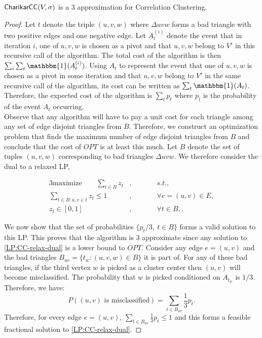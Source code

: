 \begin{theorem}
${\sf CharikarCC}(V,\sigma)$ is a $3$ approximation for Correlation Clustering.
\end{theorem}
\begin{proof} Let $t$ denote the triple $(u,v,w)$ where $\Delta uvw$ forms a bad triangle with two positive edges and one negative edge. Let $A_t^{(i)}$ denote the event that in iteration $i$, one of $u,v,w$ is chosen as a pivot and that $u,v,w$ belong to $V'$ in this recursive call of the algorithm. The total cost of the algorithm is then $\sum_i \sum_t \mathbbm{1} (A_t^{(i)})$. Using $A_t$ to represent the event that one of $u,v,w$ is chosen as a pivot in some iteration and that $u,v,w$ belong to $V'$ in the same recursive call of the algorithm, its cost can be written as $\sum_t \mathbbm{1} (A_t)$. Therefore, the expected cost of the algorithm is $\sum_t p_t$ where $p_t$ is the probability of the event $A_t$ occurring.\\

\noindent Observe that any algorithm will have to pay a unit cost for each triangle among any set of edge disjoint triangles from $B$. Therefore, we construct an optimization problem that finds the maximum number of edge disjoint triangles from $B$ and conclude that the cost of $OPT$ is at least this much. Let $B$ denote the set of tuples $(u,v,w)$ corresponding to bad triangles $\Delta uvw$. We therefore consider the dual to a relaxed LP,

\begin{alignat}{3} \label{LP:CC-relax-dual}
		\text{maximize} \qquad \sum_{t \in B} z_t &, && \qquad s.t., \nonumber\\
		\sum_{t \in B : u,v \in t} z_t \le 1& , &&\qquad \forall e = (u,v) \in E , \nonumber\\
		z_{t} \in [ 0,1 ]&, &&\qquad \forall t \in B,.\tag{LP1}
\end{alignat}

We now show that the set of probabilities $\{ p_t / 3,\ t \in B \}$ forms a valid solution to this LP. This proves that the algorithm is $3$ approximate since any solution to \ref{LP:CC-relax-dual} is a lower bound to $OPT$. Consider any edge $e = (u,v)$ and the bad triangles $B_{uv} = \{ t_w : (u,v,w) \in B \}$ it is part of. For any of these bad triangles, if the third vertex $w$ is picked as a cluster center then $(u,v)$ will become misclassified. The probability that $w$ is picked conditioned on $A_{t_w}$ is $1/3$. Therefore, we have:
\begin{equation} \label{eq:0000}
    P ( (u,v) \text{ is misclassified}) = \sum_{t \in B_{uv}} \frac{1}{3} p_t.
\end{equation}
Therefore, for every edge $e = (u,v)$, $\sum_{t \in B_{uv}} \frac{1}{3} p_t \le 1$ and this forms a feasible fractional solution to \ref{LP:CC-relax-dual}.
\end{proof}

